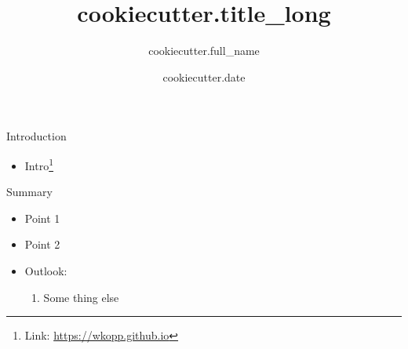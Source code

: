 \documentclass{beamer}
\title[ {{cookiecutter.title_short}} ]{ {{cookiecutter.title_long}} }
\author{ {{cookiecutter.full_name}} }
\institute[ {{cookiecutter.address_short}} ] %
{
	{{cookiecutter.address}}
}
\date{ {{cookiecutter.date}} }
\begin{document}
\begin{frame}
  \titlepage
\end{frame}
%
\begin{frame}{Introduction}
    \begin{itemize}
        \item Intro\footnote{Link: \url{https://wkopp.github.io}}
    \end{itemize}

\end{frame}


\begin{frame}{Summary}
\begin{itemize}
    \item Point 1
    \item Point 2
    \pause
    \item Outlook:
    \begin{enumerate}
        \item Some thing else
    \end{enumerate}
\end{itemize}
\end{frame}


\end{document}
